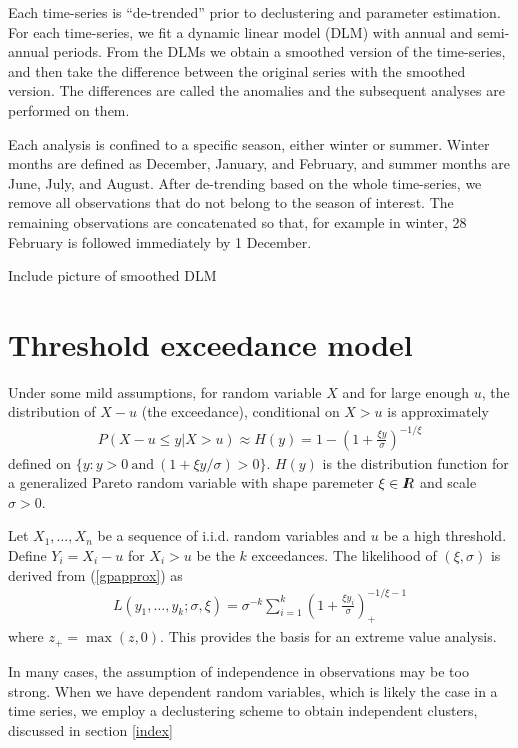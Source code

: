 \documentclass[12pt]{article}
\newcommand{\R}{I\hspace{-4.4pt}R}
\newcommand{\R}{I\hspace{-4.4pt}R}
\begin{document}
Each time-series is ``de-trended'' prior to declustering and parameter estimation. For each time-series, we fit a dynamic linear model (DLM) with annual and semi-annual periods. From the DLMs we obtain a smoothed version of the time-series, and then take the difference between the original series with the smoothed version. The differences are called the anomalies and the subsequent analyses are performed on them.

Each analysis is confined to a specific season, either winter or summer. Winter months are defined as December, January, and February, and summer months are June, July, and August. After de-trending based on the whole time-series, we remove all observations that do not belong to the season of interest. The remaining observations are concatenated so that, for example in winter, 28 February is followed immediately by 1 December.

Include picture of smoothed DLM
 
\section{Threshold exceedance model}
\label{thresh}

Under some mild assumptions, for random variable $X$ and for large enough $u$, the distribution of $X-u$ (the exceedance), conditional on $X>u$ is approximately
\begin{align}
P(X-u\leq y|X>u) \approx H(y) = 1 - \left(1+\frac{\xi y}{\sigma}\right)^{-1/\xi} \label{gpapprox}
\end{align}
defined on $\{y:y>0~\mathrm{and}~(1+\xi y/\sigma) >0\}$. $H(y)$ is the distribution function for a generalized Pareto random variable with shape paremeter $\xi\in\R$ and scale $\sigma>0$.

Let $X_1,\ldots,X_n$ be a sequence of i.i.d. random variables and $u$ be a high threshold. Define $Y_i=X_i-u$ for $X_i>u$ be the $k$ exceedances. The likelihood of $(\xi,\sigma)$ is derived from (\ref{gpapprox}) as
\begin{align}
L(y_1,\ldots,y_k;\sigma,\xi)=\sigma^{-k}\sum_{i=1}^k\left(1+\frac{\xi y_i}{\sigma}\right)_+^{-1/\xi-1} \label{gplike}
\end{align}
where $z_+=\max(z,0)$. This provides the basis for an extreme value analysis.

In many cases, the assumption of independence in observations may be too strong. When we have dependent random variables, which is likely the case in a time series, we employ a declustering scheme to obtain independent clusters, discussed in section \ref{index}
\bigskip
\end{document}
